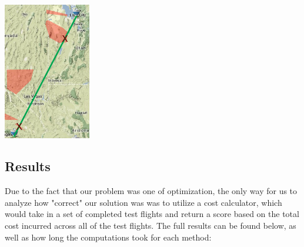 \documentclass{article}[12pt]
\begin{document}
\begin{multicols}{2}
\begingroup
  \begin{center}
    \includegraphics[width=1.5in]{baseline.png}
	\end{center}
\endgroup

\subsection{Results}
Due to the fact that our problem was one of optimization, the only way for us to analyze how "correct" our solution was was to utilize a cost calculator, which would take in a set of completed test flights and return a score based on the total cost incurred across all of the test flights. The full results can be found below, as well as how long the computations took for each method: \\


\end{multicols}
\end{document}

